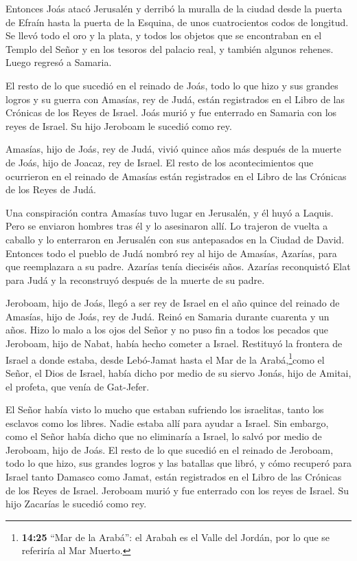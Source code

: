 Entonces Joás atacó Jerusalén y derribó la muralla de la ciudad desde la
puerta de Efraín hasta la puerta de la Esquina, de unos cuatrocientos
codos de longitud.  Se llevó todo el oro y la plata, y
todos los objetos que se encontraban en el Templo del Señor y en los
tesoros del palacio real, y también algunos rehenes. Luego regresó a
Samaria.

 El resto de lo que sucedió en el reinado de Joás, todo lo
que hizo y sus grandes logros y su guerra con Amasías, rey de Judá,
están registrados en el Libro de las Crónicas de los Reyes de Israel.
 Joás murió y fue enterrado en Samaria con los reyes de
Israel. Su hijo Jeroboam le sucedió como rey.

 Amasías, hijo de Joás, rey de Judá, vivió quince años más
después de la muerte de Joás, hijo de Joacaz, rey de Israel.
 El resto de los acontecimientos que ocurrieron en el
reinado de Amasías están registrados en el Libro de las Crónicas de los
Reyes de Judá.

 Una conspiración contra Amasías tuvo lugar en Jerusalén, y
él huyó a Laquis. Pero se enviaron hombres tras él y lo asesinaron allí.
 Lo trajeron de vuelta a caballo y lo enterraron en
Jerusalén con sus antepasados en la Ciudad de David. 
Entonces todo el pueblo de Judá nombró rey al hijo de Amasías, Azarías,
para que reemplazara a su padre. Azarías tenía dieciséis años.
 Azarías reconquistó Elat para Judá y la reconstruyó
después de la muerte de su padre.

 Jeroboam, hijo de Joás, llegó a ser rey de Israel en el
año quince del reinado de Amasías, hijo de Joás, rey de Judá. Reinó en
Samaria durante cuarenta y un años.  Hizo lo malo a los
ojos del Señor y no puso fin a todos los pecados que Jeroboam, hijo de
Nabat, había hecho cometer a Israel.  Restituyó la frontera
de Israel a donde estaba, desde Lebó-Jamat hasta el Mar de la
Arabá,\footnote{\textbf{14:25} ``Mar de la Arabá'': el Arabah es el
  Valle del Jordán, por lo que se referiría al Mar Muerto.}como el
Señor, el Dios de Israel, había dicho por medio de su siervo Jonás, hijo
de Amitai, el profeta, que venía de Gat-Jefer.

 El Señor había visto lo mucho que estaban sufriendo los
israelitas, tanto los esclavos como los libres. Nadie estaba allí para
ayudar a Israel.  Sin embargo, como el Señor había dicho
que no eliminaría a Israel, lo salvó por medio de Jeroboam, hijo de
Joás.  El resto de lo que sucedió en el reinado de
Jeroboam, todo lo que hizo, sus grandes logros y las batallas que libró,
y cómo recuperó para Israel tanto Damasco como Jamat, están registrados
en el Libro de las Crónicas de los Reyes de Israel. 
Jeroboam murió y fue enterrado con los reyes de Israel. Su hijo Zacarías
le sucedió como rey.

